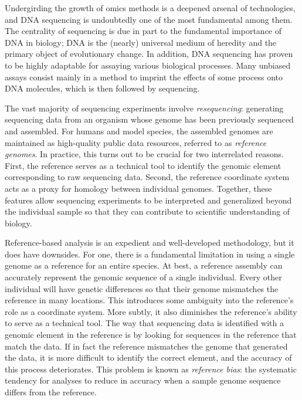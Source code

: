 \documentclass[11pt]{ucthesis}
\begin{document}
Undergirding the growth of omics methods is a deepened arsenal of technologies, and DNA sequencing is undoubtedly one of the most fundamental among them. The centrality of sequencing is due in part to the fundamental importance of DNA in biology; DNA is the (nearly) universal medium of heredity and the primary object of evolutionary change. In addition, DNA sequencing has proven to be highly adaptable for assaying various biological processes. Many unbiased assays consist mainly in a method to imprint the effects of some process onto DNA molecules, which is then followed by sequencing. 

The vast majority of sequencing experiments involve \emph{resequencing}: generating sequencing data from an organism whose genome has been previously sequenced and assembled. For humans and model species, the assembled genomes are maintained as high-quality public data resources, referred to as \emph{reference genomes}. In practice, this turns out to be crucial for two interrelated reasons. First, the reference serves as a technical tool to identify the genomic element corresponding to raw sequencing data. Second, the reference coordinate system acts as a proxy for homology between individual genomes. Together, these features allow sequencing experiments to be interpreted and generalized beyond the individual sample so that they can contribute to scientific understanding of biology.

Reference-based analysis is an expedient and well-developed methodology, but it does have downsides. For one, there is a fundamental limitation in using a single genome as a reference for an entire species. At best, a reference assembly can accurately represent the genomic sequence of a single individual. Every other individual will have genetic differences so that their genome mismatches the reference in many locations. This introduces some ambiguity into the reference's role as a coordinate system. More subtly, it also diminishes the reference's ability to serve as a technical tool. The way that sequencing data is identified with a genomic element in the reference is by looking for sequences in the reference that match the data. If in fact the reference mismatches the genome that generated the data, it is more difficult to identify the correct element, and the accuracy of this process deteriorates. This problem is known as \emph{reference bias}: the systematic tendency for analyses to reduce in accuracy when a sample genome sequence differs from the reference. 
\end{document}
